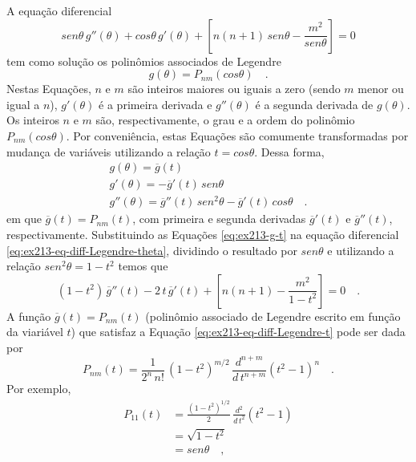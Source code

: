 \documentclass[10pt,a4paper,fleqn]{article}
\begin{document}
A equaç\~{a}o diferencial
\begin{equation}
sen \theta \, g''(\theta) + 
cos \theta \, g'(\theta) + 
\left[ n(n+1) \, sen \theta - \dfrac{m^{2}}{sen \theta} \right] = 0
\label{eq:ex213-eq-diff-Legendre-theta}
\end{equation}
tem como soluç\~{a}o os polin\^{o}mios associados de Legendre
\begin{equation}
g(\theta) = P_{nm}(cos\theta) \quad .
\label{eq:ex213-g-theta}
\end{equation}
Nestas Equaç\~{o}es, $n$ e $m$ s\~{a}o inteiros maiores ou iguais a zero (sendo $m$ menor ou igual a $n$), 
$g'(\theta)$ \'{e} a primeira derivada e $g''(\theta)$ \'{e} a segunda derivada de $g(\theta)$. Os inteiros $n$ 
e $m$ s\~{a}o, respectivamente, o grau e a ordem do polin\^{o}mio $P_{nm}(cos\theta)$. Por conveni\^{e}ncia, 
estas Equaç\~{o}es s\~{a}o comumente transformadas por mudança de vari\'{a}veis  utilizando a relaç\~{a}o 
$t = cos{\theta}$. Dessa forma,
\begin{equation}
\begin{array}{l}
g(\theta) = \overline{g}(t) \\
g'(\theta) = -\overline{g}'(t) \, sen \theta \\
g''(\theta) = \overline{g}''(t) \, sen^{2} \theta - \overline{g}'(t) \, cos \theta \quad .
\end{array}
\label{eq:ex213-g-t}
\end{equation}
em que $\overline{g}(t) = P_{nm}(t)$, com primeira e segunda derivadas $\overline{g}'(t)$ e $\overline{g}''(t)$, 
respectivamente. Substituindo as Equaç\~{o}es \ref{eq:ex213-g-t} na equaç\~{a}o diferencial 
\ref{eq:ex213-eq-diff-Legendre-theta}, dividindo o resultado por $sen \theta$ e utilizando a relaç\~{a}o $sen^{2} 
\theta = 1 - t^2$ temos que
\begin{equation}
(1 - t^2) \, \overline{g}''(t) - 2 \, t \, \overline{g}'(t) +
\left[ n(n+1) - \frac{m^{2}}{1 - t^2} \right] = 0 \quad .
\label{eq:ex213-eq-diff-Legendre-t}
\end{equation}
A funç\~{a}o $\overline{g}(t) = P_{nm}(t)$ (polin\^{o}mio associado de Legendre escrito em funç\~{a}o da viari\'{a}vel 
$t$) que satisfaz a Equaç\~{a}o \ref{eq:ex213-eq-diff-Legendre-t} pode ser dada por
\begin{equation}
P_{nm}(t) = \frac{1}{2^{n} \, n!} \, (1 - t^{2})^{m/2} \,
\frac{d^{n+m}}{d \, t^{n+m}}(t^{2} - 1)^{n} \quad .
\label{eq:ex213-pnm-t}
\end{equation}
Por exemplo,
\begin{equation}
\begin{split}
P_{11}(t) & = \frac{(1 - t^{2})^{1/2}}{2} \, \frac{d^{2}}{d \, t^{2}}(t^{2} - 1) \\
& = \sqrt{1 - t^{2}} \\
& = sen \theta \quad ,
\end{split}
\label{eq:ex213-p11-t}
\end{equation}
\end{document}
